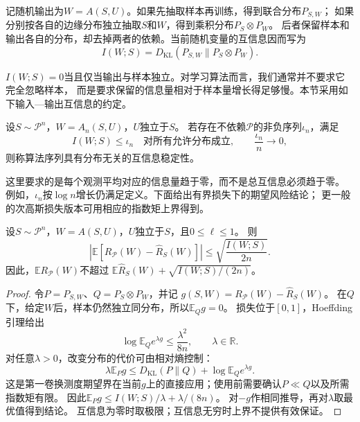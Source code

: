 记随机输出为$W=A(S,U)$。如果先抽取样本再训练，得到联合分布$P_{S,W}$；
如果分别按各自的边缘分布独立抽取$S$和$W$，得到乘积分布$P_S\otimes P_W$。
后者保留样本和输出各自的分布，却去掉两者的依赖。当前随机变量的互信息因而写为
\[
 I(W;S)=D_{\mathrm{KL}}(P_{S,W}\|P_S\otimes P_W).
\]

$I(W;S)=0$当且仅当输出与样本独立。对学习算法而言，我们通常并不要求它完全忽略样本，
而是要求保留的信息量相对于样本量增长得足够慢。本节采用如下输入—输出互信息的约定。

\begin{definition}[互信息稳定性]
\label{def:mutual-information-stability}
设$S\sim\mathcal P^n$，$W=A_n(S,U)$，$U$独立于$S$。
若存在不依赖$\mathcal P$的非负序列$\iota_n$，满足
\[
 I(W;S)\leq\iota_n\quad\text{对所有允许分布成立},
 \qquad \frac{\iota_n}{n}\longrightarrow0,
\]
则称算法序列具有分布无关的互信息稳定性。
\end{definition}

这里要求的是每个观测平均对应的信息量趋于零，而不是总互信息必须趋于零。
例如，$\iota_n$按$\log n$增长仍满足定义。下面给出有界损失下的期望风险结论；
更一般的次高斯损失版本可用相应的指数矩上界得到。

\begin{theorem}[互信息与期望风险]
\label{thm:mutual-information-risk}
设$S\sim\mathcal P^n$，$W=A(S,U)$，$U$独立于$S$，且$0\leq\ell\leq1$。
则
\begin{equation}
 \left|\mathbb E[R_{\mathcal P}(W)-\hat R_S(W)]\right|
 \leq\sqrt{\frac{I(W;S)}{2n}}.
 \label{eq:mutual-information-generalization}
\end{equation}
因此，$\mathbb E R_{\mathcal P}(W)$不超过
$\mathbb E\hat R_S(W)+\sqrt{I(W;S)/(2n)}$。
\end{theorem}
\begin{proof}
令$P=P_{S,W}$、$Q=P_S\otimes P_W$，并记
$g(S,W)=R_{\mathcal P}(W)-\hat R_S(W)$。
在$Q$下，给定$W$后，样本仍然独立同分布，所以$\mathbb E_Qg=0$。
损失位于$[0,1]$，Hoeffding引理给出
\[
 \log\mathbb E_Q e^{\lambda g}\leq\frac{\lambda^2}{8n},
 \qquad \lambda\in\mathbb R.
\]
对任意$\lambda>0$，改变分布的代价可由相对熵控制：
\begin{equation}
 \lambda\mathbb E_Pg
 \leq D_{\mathrm{KL}}(P\|Q)+\log\mathbb E_Q e^{\lambda g}.
 \label{eq:information-change-measure}
\end{equation}
这是第一卷换测度期望界在当前$g$上的直接应用；使用前需要确认$P\ll Q$以及所需
指数矩有限。
因此$\mathbb E_Pg\leq I(W;S)/\lambda+\lambda/(8n)$。
对$-g$作相同推导，再对$\lambda$取最优值得到结论。
互信息为零时取极限；互信息无穷时上界不提供有效保证。
\end{proof}

